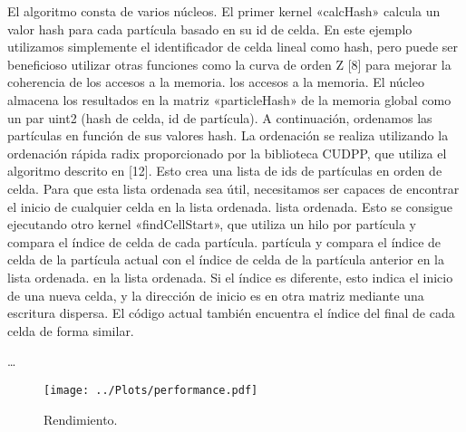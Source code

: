 El algoritmo consta de varios núcleos. El primer kernel «calcHash» calcula un valor hash para
cada partícula basado en su id de celda. En este ejemplo utilizamos simplemente el identificador de celda lineal como hash, pero
puede ser beneficioso utilizar otras funciones como la curva de orden Z [8] para mejorar la coherencia de los accesos a la memoria.
los accesos a la memoria. El núcleo almacena los resultados en la matriz «particleHash» de la memoria global como
un par uint2 (hash de celda, id de partícula).
A continuación, ordenamos las partículas en función de sus valores hash. La ordenación se realiza utilizando la ordenación rápida radix
proporcionado por la biblioteca CUDPP, que utiliza el algoritmo descrito en [12]. Esto crea una lista de
ids de partículas en orden de celda.
Para que esta lista ordenada sea útil, necesitamos ser capaces de encontrar el inicio de cualquier celda en la lista ordenada.
lista ordenada. Esto se consigue ejecutando otro kernel «findCellStart», que utiliza un hilo por partícula y compara el índice de celda de cada partícula.
partícula y compara el índice de celda de la partícula actual con el índice de celda de la partícula anterior en la lista ordenada.
en la lista ordenada. Si el índice es diferente, esto indica el inicio de una nueva celda, y la dirección de inicio es
en otra matriz mediante una escritura dispersa. El código actual también encuentra el índice del final de
cada celda de forma similar.

\dots

\cite{Green2010}

\begin{figure}
    \centering
    \texttt{[image: ../Plots/performance.pdf]}
    \caption{Rendimiento.}
    \label{fig:performance}
\end{figure}
